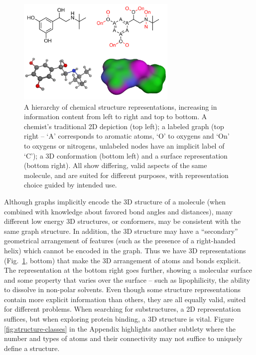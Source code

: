 \documentclass{sig-alternate}
\begin{document}
\begin{figure}
\centering
\includegraphics[height=2in]{chemical-structures.png}
\caption{A hierarchy of chemical structure representations, increasing
  in information content from left to right and top to bottom. A
  chemist's traditional 2D depiction (top left); a labeled graph (top
  right -- `A' corresponds to aromatic atoms, `O' to oxygens and `On' to
  oxygens or nitrogens, unlabeled nodes have an implicit label of `C'); a 3D
  conformation (bottom left) and a surface representation (bottom right). All show differing,
  valid aspects of the same molecule, and are suited for
  different purposes, with representation choice guided by
  intended use.}
\label{figure:chemical-structures}
\end{figure}

Although graphs implicitly encode the 3D structure of a molecule (when
combined with knowledge about favored bond angles and distances), many
different low energy 3D structures, or conformers, may be consistent
with the same graph structure. In addition, the 3D structure may have
a ``secondary'' geometrical arrangement of features (such as the
presence of a right-handed helix) which cannot be encoded in the
graph. Thus we have 3D representations
(Fig.~\ref{figure:chemical-structures}, bottom) that make the 3D arrangement
of atoms and bonds explicit. The representation at the bottom right
goes further, showing a molecular surface and some
property that varies over the surface -- such as lipophilicity, the ability to dissolve in non-polar
solvents.
Even though some structure representations contain more explicit
information than others, they are all equally valid,  suited for
different problems. When searching for substructures, a 2D
representation suffices, but when exploring protein binding, a 3D
structure is vital. Figure \ref{fig:structure-classes} in the Appendix
highlights another subtlety where the number and types of atoms
and their connectivity may not suffice to uniquely define a
structure.
\end{document}
